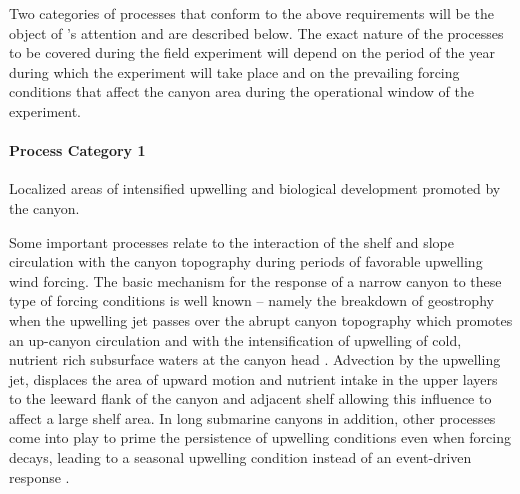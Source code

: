 
Two categories of processes that conform to the above requirements
will be the object of \proje's attention and are described below. The
exact nature of the processes to be covered during the field
experiment will depend on the period of the year during which the
experiment will take place and on the prevailing forcing conditions
that affect the \naz canyon area during the operational window of the
experiment.

  
\paragraph{Process Category 1} Localized areas of intensified
upwelling and biological development promoted by the canyon.

Some important processes relate to the interaction of the shelf and
slope circulation with the canyon topography during periods of
favorable upwelling wind forcing. The basic mechanism for the response
of a narrow canyon to these type of forcing conditions is well known
-- namely the breakdown of geostrophy when the upwelling jet passes
over the abrupt canyon topography which promotes an up-canyon
circulation and with the intensification of upwelling of cold,
nutrient rich subsurface waters at the canyon head
\cite{klinck96,she00}. Advection by the upwelling jet, displaces the
area of upward motion and nutrient intake in the upper layers to the
leeward flank of the canyon and adjacent shelf allowing this influence
to affect a large shelf area. In long submarine canyons in addition,
other processes come into play to prime the persistence of upwelling
conditions even when forcing decays, leading to a seasonal upwelling
condition instead of an event-driven response
\cite{allen00,waterhouse09}.

